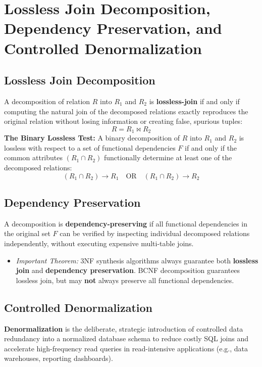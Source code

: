 \newpage
\section{Lossless Join Decomposition, Dependency Preservation, and Controlled Denormalization}

\subsection{Lossless Join Decomposition}

A decomposition of relation $R$ into $R_1$ and $R_2$ is \textbf{lossless-join} if and only if computing the natural join of the decomposed relations exactly reproduces the original relation without losing information or creating false, spurious tuples:
\[ R = R_1 \bowtie R_2 \]
\textbf{The Binary Lossless Test:} A binary decomposition of $R$ into $R_1$ and $R_2$ is lossless with respect to a set of functional dependencies $F$ if and only if the common attributes $(R_1 \cap R_2)$ functionally determine at least one of the decomposed relations:
\[ (R_1 \cap R_2) \rightarrow R_1 \quad \text{OR} \quad (R_1 \cap R_2) \rightarrow R_2 \]

\subsection{Dependency Preservation}

A decomposition is \textbf{dependency-preserving} if all functional dependencies in the original set $F$ can be verified by inspecting individual decomposed relations independently, without executing expensive multi-table joins.
\begin{itemize}
\item \textit{Important Theorem:} 3NF synthesis algorithms always guarantee both \textbf{lossless join} and \textbf{dependency preservation}. BCNF decomposition guarantees lossless join, but may \textbf{not} always preserve all functional dependencies.
\end{itemize}

\subsection{Controlled Denormalization}

\textbf{Denormalization} is the deliberate, strategic introduction of controlled data redundancy into a normalized database schema to reduce costly SQL joins and accelerate high-frequency read queries in read-intensive applications (e.g., data warehouses, reporting dashboards).


